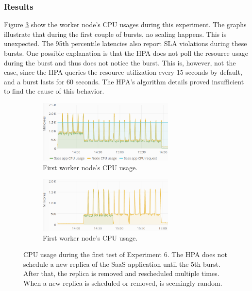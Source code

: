 \subsubsection{Results}
Figure \ref{fig:cpu-saas-hpa-bursty} show the worker node's CPU usages during this experiment. The graphs illustrate that during the first couple of bursts, no scaling happens. This is unexpected. The 95th percentile latencies also report SLA violations during these bursts. One possible explanation is that the HPA does not poll the resource usage during the burst and thus does not notice the burst. This is, however, not the case, since the HPA queries the resource utilization every 15 seconds by default, and a burst lasts for 60 seconds. The HPA's algorithm details \citep{hpa-algorithm-details} proved insufficient to find the cause of this behavior.\\


\begin{figure}[H]
\centering
\begin{subfigure}[b]{\textwidth}
\centering
\includegraphics[width=0.75\textwidth]{Images/Experiments/CPU/Grafana/cpu-saas-hpa-bursty-2-1.PNG}
\caption{First worker node's CPU usage.}
\label{fig:cpu-saas-hpa-bursty-2-1}
\end{subfigure}
\hfill
\begin{subfigure}[b]{\textwidth}
\centering
\includegraphics[width=0.75\textwidth]{Images/Experiments/CPU/Grafana/cpu-saas-hpa-bursty-2-2.PNG}
\caption{First worker node's CPU usage.}
\label{fig:cpu-saas-hpa-bursty-2-2}
\end{subfigure}
\hfill
\caption{CPU usage during the first test of Experiment 6. The HPA does not schedule a new replica of the SaaS application until the 5th burst. After that, the replica is removed and rescheduled multiple times. When a new replica is scheduled or removed, is seemingly random. }
\label{fig:cpu-saas-hpa-bursty}
\end{figure}

